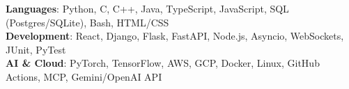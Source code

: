 \begin{itemize}[leftmargin=0.15in, label={}]
    \small{\item{
     \textbf{Languages}{: Python, C, C++, Java, TypeScript, JavaScript, SQL (Postgres/SQLite), Bash, HTML/CSS} \\
     \textbf{Development}{: React, Django, Flask, FastAPI, Node.js, Asyncio, WebSockets, JUnit, PyTest} \\
     \textbf{AI \& Cloud}{: PyTorch, TensorFlow, AWS, GCP, Docker, Linux, GitHub Actions, MCP, Gemini/OpenAI API}
    }}
\end{itemize}
